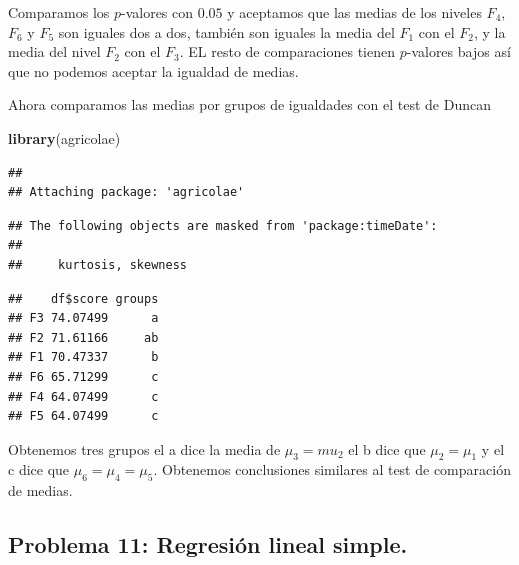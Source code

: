 \documentclass[
]{article}
\newenvironment{Shaded}{\begin{snugshade}}{\end{snugshade}}
\newcommand{\DataTypeTok}[1]{\textcolor[rgb]{0.13,0.29,0.53}{#1}}
\newcommand{\KeywordTok}[1]{\textcolor[rgb]{0.13,0.29,0.53}{\textbf{#1}}}
\newcommand{\NormalTok}[1]{#1}
\newcommand{\OperatorTok}[1]{\textcolor[rgb]{0.81,0.36,0.00}{\textbf{#1}}}
\newcommand{\OtherTok}[1]{\textcolor[rgb]{0.56,0.35,0.01}{#1}}
\newcommand{\StringTok}[1]{\textcolor[rgb]{0.31,0.60,0.02}{#1}}
\begin{document}
Comparamos los \(p\)-valores con \(0.05\) y aceptamos que las medias de
los niveles \(F_4\), \(F_6\) y \(F_5\) son iguales dos a dos, también
son iguales la media del \(F_1\) con el \(F_2\), y la media del nivel
\(F_2\) con el \(F_3\). EL resto de comparaciones tienen \(p\)-valores
bajos así que no podemos aceptar la igualdad de medias.

Ahora comparamos las medias por grupos de igualdades con el test de
Duncan

\begin{Shaded}
\begin{Highlighting}[]
\KeywordTok{library}\NormalTok{(agricolae)}
\end{Highlighting}
\end{Shaded}

\begin{verbatim}
## 
## Attaching package: 'agricolae'
\end{verbatim}

\begin{verbatim}
## The following objects are masked from 'package:timeDate':
## 
##     kurtosis, skewness
\end{verbatim}

\begin{Shaded}
\end{Shaded}

\begin{verbatim}
##    df$score groups
## F3 74.07499      a
## F2 71.61166     ab
## F1 70.47337      b
## F6 65.71299      c
## F4 64.07499      c
## F5 64.07499      c
\end{verbatim}

Obtenemos tres grupos el a dice la media de \(\mu_3=mu_2\) el b dice que
\(\mu_2=\mu_1\) y el c dice que \(\mu_6=\mu_4=\mu_5\). Obtenemos
conclusiones similares al test de comparación de medias.

\hypertarget{problema-11-regresiuxf3n-lineal-simple.}{%
\subsection{Problema 11: Regresión lineal
simple.}\label{problema-11-regresiuxf3n-lineal-simple.}}
\end{document}

